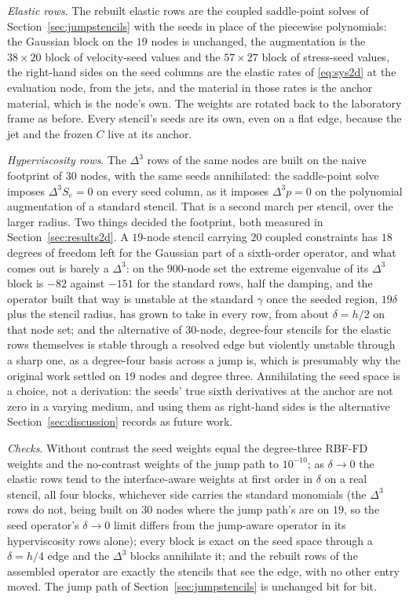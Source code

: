 \documentclass[11pt]{amsart}
\theoremstyle{definition}
\theoremstyle{remark}
\newcommand{\para}[1]{\par\smallskip\noindent\textit{#1}.\enspace}
\begin{document}
\para{Elastic rows}
The rebuilt elastic rows are the coupled saddle-point solves of
Section~\ref{sec:jumpstencils} with the seeds in place of the piecewise
polynomials: the Gaussian block on the $19$ nodes is unchanged, the
augmentation is the $38 \times 20$ block of velocity-seed values and the
$57 \times 27$ block of stress-seed values, the right-hand sides on the
seed columns are the elastic rates of \eqref{eq:sys2d} at the evaluation
node, from the jets, and the material in those rates is the anchor
material, which is the node's own. The weights are rotated back to the
laboratory frame as before. Every stencil's seeds are its own, even on a
flat edge, because the jet and the frozen $C$ live at its anchor.

\para{Hyperviscosity rows}
The $\Delta^3$ rows of the same nodes are built on the naive footprint
of $30$ nodes, with the same seeds annihilated: the saddle-point solve
imposes $\Delta^3 S_e = 0$ on every seed column, as it imposes $\Delta^3
p = 0$ on the polynomial augmentation of a standard stencil. That is a
second march per stencil, over the larger radius. Two things decided the
footprint, both measured in Section~\ref{sec:results2d}. A $19$-node
stencil carrying $20$ coupled constraints has $18$ degrees of freedom
left for the Gaussian part of a sixth-order operator, and what comes out
is barely a $\Delta^3$: on the $900$-node set the extreme eigenvalue of
its $\Delta^3$ block is $-82$ against $-151$ for the standard rows, half
the damping, and the operator built that way is unstable at the standard
$\gamma$ once the seeded region, $19\delta$ plus the stencil radius, has
grown to take in every row, from about $\delta = h / 2$ on that node
set; and the alternative
of $30$-node, degree-four stencils for the elastic rows themselves is
stable through a resolved edge but violently unstable through a sharp
one, as a degree-four basis across a jump is, which is presumably why
the original work settled on $19$ nodes and degree three. Annihilating
the seed space is a choice, not a derivation: the seeds' true sixth
derivatives at the anchor are not zero in a varying medium, and using
them as right-hand sides is the alternative Section~\ref{sec:discussion}
records as future work.

\para{Checks}
Without contrast the seed weights equal the degree-three RBF-FD weights
and the no-contrast weights of the jump path to $10^{-10}$; as
$\delta \to 0$ the elastic rows tend to the interface-aware weights at
first order in $\delta$ on a real stencil, all four blocks, whichever side
carries the standard monomials (the $\Delta^3$ rows do not, being built
on $30$ nodes where the jump path's are on $19$, so the seed operator's
$\delta \to 0$ limit differs from the jump-aware operator in its
hyperviscosity rows alone); every block is exact on the seed space through a
$\delta = h / 4$ edge and the $\Delta^3$ blocks annihilate it; and the
rebuilt rows of the assembled operator are exactly the stencils that
see the edge, with no other entry moved. The jump path of
Section~\ref{sec:jumpstencils} is unchanged bit for bit.
\end{document}
